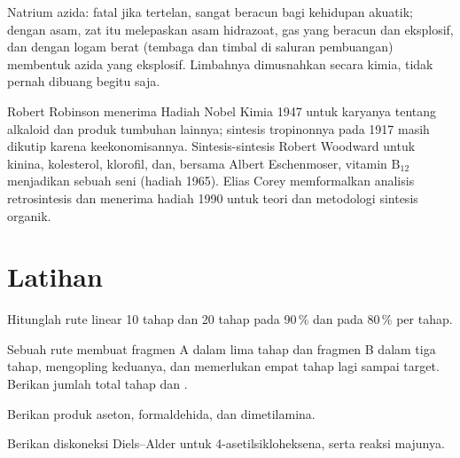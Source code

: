 \begin{safety}{}
Natrium azida: fatal jika tertelan, sangat beracun bagi kehidupan akuatik; dengan asam, zat itu
melepaskan asam hidrazoat, gas yang beracun dan eksplosif, dan dengan logam berat
(tembaga dan timbal di saluran pembuangan) membentuk azida yang eksplosif. Limbahnya dimusnahkan
secara kimia, tidak pernah dibuang begitu saja.
\end{safety}

\begin{history}
Robert Robinson menerima Hadiah Nobel Kimia 1947 untuk karyanya tentang
alkaloid dan produk tumbuhan lainnya; sintesis tropinonnya pada 1917 masih
dikutip karena keekonomisannya. Sintesis-sintesis Robert Woodward untuk kinina, kolesterol,
klorofil, dan, bersama Albert Eschenmoser, vitamin $\mathrm B_{12}$ menjadikan  sebuah seni
(hadiah 1965). Elias Corey memformalkan analisis retrosintesis dan menerima
hadiah 1990 untuk teori dan metodologi sintesis organik.
\end{history}

\section{Latihan}

\begin{exercise}[$\star$]\label{exo:b3:total-synthesis:1}
Hitunglah  rute linear 10 tahap dan 20 tahap pada 90\,\% dan pada 80\,\% per
tahap.
\end{exercise}

\begin{exercise}[$\star$]\label{exo:b3:total-synthesis:2}
Sebuah rute membuat fragmen A dalam lima tahap dan fragmen B dalam tiga tahap, mengopling keduanya, dan
memerlukan empat tahap lagi sampai target. Berikan jumlah total tahap dan
.
\end{exercise}

\begin{exercise}[$\star$]\label{exo:b3:total-synthesis:3}
Berikan produk  aseton, formaldehida, dan
dimetilamina.
\end{exercise}

\begin{exercise}[$\star$]\label{exo:b3:total-synthesis:4}
Berikan diskoneksi Diels--Alder untuk 4-asetilsikloheksena, serta reaksi
majunya.
\end{exercise}

